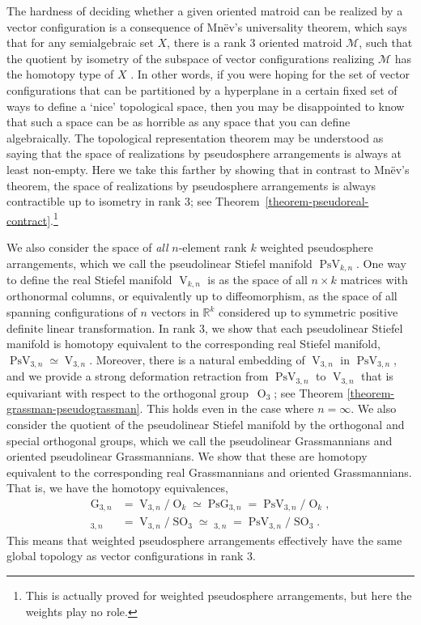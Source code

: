 \documentclass[11pt]{article}
\numberwithin{equation}{section}
\theoremstyle{remark}
\let\mc\mathcal
\DeclareMathOperator{\pg}{PsG}
\DeclareMathOperator{\pog}{Ps\widetilde G}
\DeclareMathOperator{\g}{G}
\DeclareMathOperator{\oG}{\widetilde G}
\DeclareMathOperator{\orth}{O}
\DeclareMathOperator{\sorth}{SO}
\DeclareMathOperator{\stief}{V}
\DeclareMathOperator{\pstief}{PsV}
\begin{document}
The hardness of deciding whether a given oriented matroid can be realized by a vector configuration is a consequence of Mnëv's universality theorem, which says that for any semialgebraic set $X$, there is a rank $3$ oriented matroid $\mc{M}$, such that the quotient by isometry of the subspace of vector configurations realizing $\mc{M}$ has the homotopy type of $X$ \cite{mnev1988universality}.
In other words, if you were hoping for the set of vector configurations that can be partitioned by a hyperplane in a certain fixed set of ways to define a `nice' topological space, then you may be disappointed to know that such a space can be as horrible as any space that you can define algebraically.
The topological representation theorem may be understood as saying that the space of realizations by pseudosphere arrangements is always at least non-empty.
Here we take this farther by showing that in contrast to Mnëv's theorem, the space of realizations by pseudosphere arrangements is always contractible up to isometry in rank 3; see Theorem~\ref{theorem-pseudoreal-contract}.\footnote{This is actually proved for weighted pseudosphere arrangements, but here the weights play no role.}

We also consider the space of \emph{all} $n$-element rank $k$ weighted pseudosphere arrangements, which we call the pseudolinear Stiefel manifold $\pstief_{k,n}$.
One way to define the real Stiefel manifold $\stief_{k,n}$ is as the space of all $n \times k$ matrices with orthonormal columns, or equivalently up to diffeomorphism, as the space of all spanning configurations of $n$ vectors in $\mathbb{R}^k$ considered up to symmetric positive definite linear transformation.
In rank 3, we show that each pseudolinear Stiefel manifold is homotopy equivalent to the corresponding real Stiefel manifold, $\pstief_{3,n} \simeq \stief_{3,n}$.
Moreover, there is a natural embedding of $\stief_{3,n}$ in $\pstief_{3,n}$, and we provide a strong deformation retraction from $\pstief_{3,n}$ to $\stief_{3,n}$ that is equivariant with respect to the orthogonal group~$\orth_3$; see Theorem \ref{theorem-grassman-pseudograssman}.
This holds even in the case where $n = \infty$.
We also consider the quotient of the pseudolinear Stiefel manifold by the orthogonal and special orthogonal groups, which we call the pseudolinear Grassmannians and oriented pseudolinear Grassmannians. We show that these are homotopy equivalent to the corresponding real Grassmannians and oriented Grassmannians.
That is, we have the homotopy equivalences,
\begin{align*}
\g_{3,n} &= \stief_{3,n} / \orth_k \simeq \pg_{3,n} = \pstief_{3,n} / \orth_k, \\
\oG_{3,n} &= \stief_{3,n} / \sorth_3 \simeq \pog_{3,n} = \pstief_{3,n} / \sorth_3.
\end{align*}
This means that weighted pseudosphere arrangements effectively have the same global topology as vector configurations in rank 3.
\end{document}
